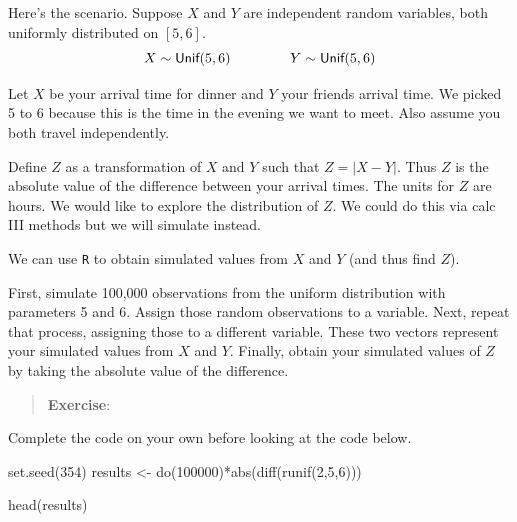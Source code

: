 \documentclass[
  letterpaper,
  DIV=11,
  numbers=noendperiod]{scrreprt}
\newenvironment{Shaded}{\begin{snugshade}}{\end{snugshade}}
\newcommand{\DecValTok}[1]{\textcolor[rgb]{0.68,0.00,0.00}{#1}}
\newcommand{\FunctionTok}[1]{\textcolor[rgb]{0.28,0.35,0.67}{#1}}
\newcommand{\NormalTok}[1]{\textcolor[rgb]{0.00,0.23,0.31}{#1}}
\newcommand{\OtherTok}[1]{\textcolor[rgb]{0.00,0.23,0.31}{#1}}
\newcommand{\SpecialCharTok}[1]{\textcolor[rgb]{0.37,0.37,0.37}{#1}}
\begin{document}
Here's the scenario. Suppose \(X\) and \(Y\) are independent random
variables, both uniformly distributed on \([5,6]\). \[
X\sim \textsf{Unif}(5,6)\hspace{1.5cm} Y\sim \textsf{Unif}(5,6)
\]

Let \(X\) be your arrival time for dinner and \(Y\) your friends arrival
time. We picked 5 to 6 because this is the time in the evening we want
to meet. Also assume you both travel independently.

Define \(Z\) as a transformation of \(X\) and \(Y\) such that
\(Z=|X-Y|\). Thus \(Z\) is the absolute value of the difference between
your arrival times. The units for \(Z\) are hours. We would like to
explore the distribution of \(Z\). We could do this via calc III methods
but we will simulate instead.

We can use \texttt{R} to obtain simulated values from \(X\) and \(Y\)
(and thus find \(Z\)).

First, simulate 100,000 observations from the uniform distribution with
parameters 5 and 6. Assign those random observations to a variable.
Next, repeat that process, assigning those to a different variable.
These two vectors represent your simulated values from \(X\) and \(Y\).
Finally, obtain your simulated values of \(Z\) by taking the absolute
value of the difference.

\begin{quote}
\textbf{Exercise}:
\end{quote}

Complete the code on your own before looking at the code below.

\begin{Shaded}
\begin{Highlighting}[]
\FunctionTok{set.seed}\NormalTok{(}\DecValTok{354}\NormalTok{)}
\NormalTok{results }\OtherTok{\textless{}{-}} \FunctionTok{do}\NormalTok{(}\DecValTok{100000}\NormalTok{)}\SpecialCharTok{*}\FunctionTok{abs}\NormalTok{(}\FunctionTok{diff}\NormalTok{(}\FunctionTok{runif}\NormalTok{(}\DecValTok{2}\NormalTok{,}\DecValTok{5}\NormalTok{,}\DecValTok{6}\NormalTok{)))}
\end{Highlighting}
\end{Shaded}

\begin{Shaded}
\begin{Highlighting}[]
\FunctionTok{head}\NormalTok{(results)}
\end{Highlighting}
\end{Shaded}
\end{document}
